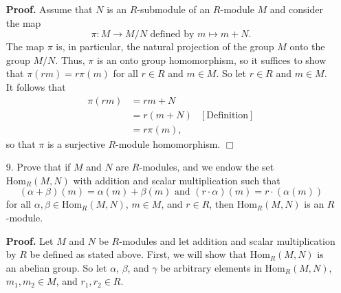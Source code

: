 \documentclass[9pt]{article}
\newcommand{\qed}{\hfill \ensuremath{\Box}}
\begin{document}
\begin{enumerate}
      \textbf{Proof.} Assume that $N$ is an $R$-submodule of an $R$-module $M$
      and consider the map
      $$\pi : M \rightarrow M/N \text{ defined by } m \mapsto m + N.$$
      The map $\pi$ is, in particular, the natural projection of the group $M$
      onto the group $M/N$. Thus, $\pi$ is an onto group homomorphism, so it
      suffices to show that $\pi(rm) = r\pi(m)$ for all $r \in R$ and $m \in M$.
      So let $r \in R$ and $m \in M$. It follows that
      \begin{align*}
         \pi(rm) &= rm + N \\
            &= r(m + N) &[\text{Definition}] \\
            &= r\pi(m),
      \end{align*}
      so that $\pi$ is a surjective $R$-module homomorphism. \qed
   \item[9.]   Prove that if $M$ and $N$ are $R$-modules, and we endow the set
               $\text{Hom}_R(M, N)$ with addition and scalar multiplication such
               that
               $$(\alpha + \beta)(m) = \alpha(m) + \beta(m) \text{ and }
                 (r \cdot \alpha)(m) = r \cdot(\alpha(m))$$
               for all $\alpha, \beta \in \text{Hom}_R(M, N)$, $m \in M$, and
               $r \in R$, then $\text{Hom}_R(M, N)$ is an $R$-module.

      \textbf{Proof.} Let $M$ and $N$ be $R$-modules and let addition and scalar
      multiplication by $R$ be defined as stated above. First, we will show that
      $\text{Hom}_R(M, N)$ is an abelian group. So let $\alpha$, $\beta$, and
      $\gamma$ be arbitrary elements in $\text{Hom}_R(M, N)$, $m_1, m_2 \in M$,
      and $r_1,r_2 \in R$.


\end{enumerate}
\end{document}
